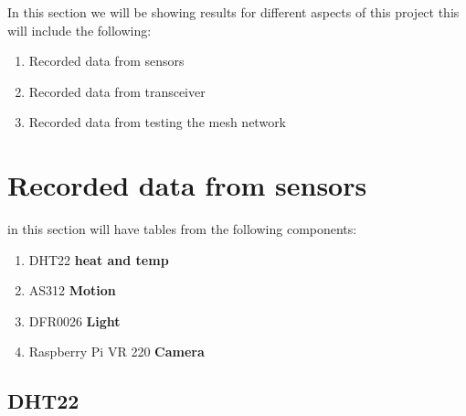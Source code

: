 In this section we will  be showing results for  different aspects of this project this  will  include the following:
\begin{enumerate}
    \item Recorded data from sensors
    \item Recorded data from transceiver
    \item Recorded data from  testing the mesh network
\end{enumerate}
\section{Recorded data from sensors}
in this section  will have  tables from the following components:
\begin{enumerate}
    \item DHT22 \textbf{heat and temp}
    \item AS312 \textbf{Motion }
    \item DFR0026 \textbf{Light}
    \item Raspberry Pi VR 220 \textbf{Camera}
\end{enumerate}
\subsection{DHT22}
